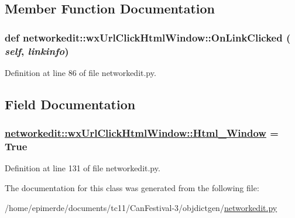 \subsection{Member Function Documentation}
\hypertarget{classnetworkedit_1_1wxUrlClickHtmlWindow_5771c9faa8f337f6a279ac395a31f037}{
\subsubsection[OnLinkClicked]{\setlength{\rightskip}{0pt plus 5cm}def networkedit::wx\-Url\-Click\-Html\-Window::On\-Link\-Clicked ( {\em self},  {\em linkinfo})}}
\label{classnetworkedit_1_1wxUrlClickHtmlWindow_5771c9faa8f337f6a279ac395a31f037}




Definition at line 86 of file networkedit.py.

\subsection{Field Documentation}
\hypertarget{classnetworkedit_1_1wxUrlClickHtmlWindow_afbd518c3d5d17bfd1e0241e77f26c27}{
\subsubsection[Html\_\-Window]{\setlength{\rightskip}{0pt plus 5cm}\hyperlink{classnetworkedit_1_1wxUrlClickHtmlWindow_afbd518c3d5d17bfd1e0241e77f26c27}{networkedit::wx\-Url\-Click\-Html\-Window::Html\_\-Window} = True}}
\label{classnetworkedit_1_1wxUrlClickHtmlWindow_afbd518c3d5d17bfd1e0241e77f26c27}




Definition at line 131 of file networkedit.py.

The documentation for this class was generated from the following file:\begin{CompactItemize}
\item 
/home/epimerde/documents/tc11/Can\-Festival-3/objdictgen/\hyperlink{networkedit_8py}{networkedit.py}\end{CompactItemize}

